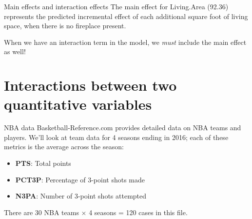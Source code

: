 \documentclass{beamer}\usepackage[]{graphicx}\usepackage[]{color}
\begin{document}
\begin{darkframes}
\begin{frame}[fragile]{Main effects and interaction effects}
      \pause
      The main effect for Living.Area (92.36) represents the predicted incremental effect of each additional square foot of living space, when there is no fireplace present.

      \bigskip\pause
      When we have an interaction term in the model, we \emph{must} include the main effect as well!
    \end{frame}

    \section{Interactions between two quantitative variables}

    \begin{frame}{NBA data}
      Basketball-Reference.com provides detailed data on NBA teams and players. We'll look at team data for 4 seasons ending in 2016; each of these metrics is the average across the season:
      \begin{itemize}
        \item \textbf{PTS}: Total points
        \item \textbf{PCT3P}: Percentage of 3-point shots made
        \item \textbf{N3PA}: Number of 3-point shots attempted
      \end{itemize}
      There are 30 NBA teams $\times$ 4 seasons = 120 cases in this file.
    \end{frame}


\end{darkframes}
\end{document}

